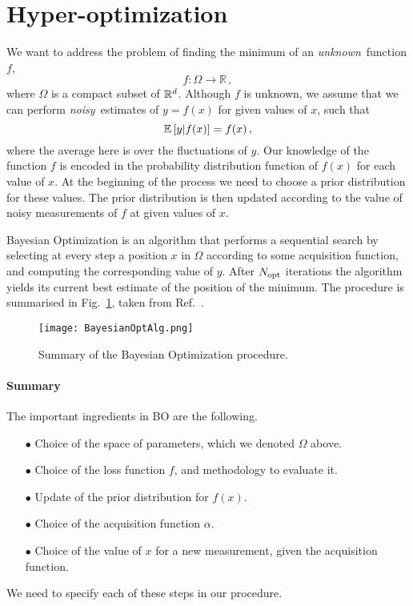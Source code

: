 \section{Hyper-optimization}
\label{sec:hyper-opt}

We want to address the problem of finding the minimum of an {\em unknown}\ function $f$,
\begin{equation}
    \label{eq:FDef}
    f: \Omega \to \mathbb{R}\, ,
\end{equation} 
where $\Omega$ is a compact subset of $\mathbb{R}^d$. Although $f$ is unknown, we assume
that we can perform {\em noisy}\ estimates of $y=f(x)$ for given values of $x$,
such that
\begin{equation}
    \label{eq:UnbiasedEval}
    \mathbb{E}\left[y|f(x)\right] = f(x)\, ,
\end{equation}
where the average here is over the fluctuations of $y$. Our knowledge of the function $f$ is encoded in the probability distribution function of $f(x)$ for each value of $x$. At the beginning of the process we need to choose a prior distribution for these values. The prior distribution is then updated according to the value of noisy measurements of $f$ at given values of $x$.  

Bayesian Optimization is an algorithm that performs a sequential search by
selecting at every step a position $x$ in $\Omega$ according to some acquisition
function, and computing the corresponding value of $y$. After $N_\mathrm{opt}$ iterations
the algorithm yields its current best estimate of the position of the minimum.
The procedure is summarised in Fig.~\ref{fig:BOpt}, taken from
Ref.~\cite{Shahriari}.

\begin{figure}[ht!]
    \label{fig:BOpt}
    \centering
    \texttt{[image: BayesianOptAlg.png]}
    \caption{\small Summary of the Bayesian Optimization procedure.}
\end{figure}

\paragraph[]{Summary} The important ingredients in BO are the following. 
%
\begin{enumerate}
    \item[$\bullet$] Choice of the space of parameters, which we denoted $\Omega$ above.  
    \item[$\bullet$] Choice of the loss function $f$, and methodology to evaluate it. 
    \item[$\bullet$] Update of the prior distribution for $f(x)$.
    \item[$\bullet$] Choice of the acquisition function $\alpha$.
    \item[$\bullet$] Choice of the value of $x$ for a new measurement, given the acquisition function.   
\end{enumerate}
%
We need to specify each of these steps in our procedure. 


